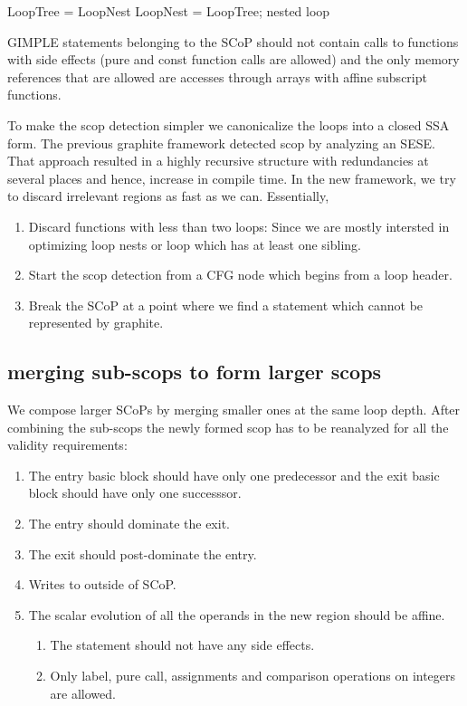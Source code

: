 \documentclass{sigplanconf}
\begin{document}
LoopTree = LoopNest
LoopNest = LoopTree; nested loop

GIMPLE statements belonging to the SCoP should not contain calls to functions with
side effects (pure and const function calls are allowed) and the only memory references
that are allowed are accesses through arrays with affine subscript functions.

To make the scop detection simpler we canonicalize the loops into a closed SSA form.
The previous graphite framework detected scop by analyzing an SESE. That approach resulted in a highly recursive structure
with redundancies at several places and hence, increase in compile time. In the new framework, we try to discard irrelevant
regions as fast as we can. Essentially,

\begin{enumerate}
\item Discard functions with less than two loops: Since we are mostly intersted in optimizing loop nests
or loop which has at least one sibling.
\item Start the scop detection from a CFG node which begins from a loop header.
\item Break the SCoP at a point where we find a statement which cannot be represented by graphite.
\end{enumerate}


\subsection{merging sub-scops to form larger scops}
We compose larger SCoPs by merging smaller ones at the same loop depth. After combining the sub-scops
the newly formed scop has to be reanalyzed for all the validity requirements:
\begin{enumerate}
  \item The entry basic block should have only one predecessor and the exit basic block should have only one
    successsor.
  \item The entry should dominate the exit.
  \item The exit should post-dominate the entry.
  \item Writes to outside of SCoP.
  \item The scalar evolution of all the operands in the new region should be affine.

    \begin{enumerate}
      \item The statement should not have any side effects.
      \item Only label, pure call, assignments and comparison operations on integers are allowed.
    \end{enumerate}
\end{enumerate}
\end{document}

